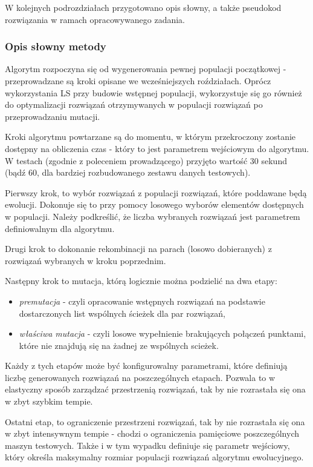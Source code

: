 \documentclass{article}
\begin{document}
W kolejnych podrozdziałach przygotowano opis słowny, a także pseudokod rozwiązania w ramach opracowywanego zadania. 

\subsubsection{Opis słowny metody}
Algorytm rozpoczyna się od wygenerowania pewnej populacji początkowej - przeprowadzane są kroki opisane we wcześniejszych roździałach. Oprócz wykorzystania LS przy budowie wstępnej populacji, wykorzystuje się go również do optymalizacji rozwiązań otrzymywanych w populacji rozwiązań po przeprowadzaniu mutacji.

Kroki algorytmu powtarzane są do momentu, w którym przekroczony zostanie dostępny na obliczenia czas - który to jest parametrem wejściowym do algorytmu. W testach (zgodnie z poleceniem prowadzącego) przyjęto wartość 30 sekund (bądź 60, dla bardziej rozbudowanego zestawu danych testowych). 

Pierwszy krok, to wybór rozwiązań z populacji rozwiązań, które poddawane będą ewolucji. Dokonuje się to przy pomocy losowego wyborów elementów dostępnych w populacji. Należy podkreślić, że liczba wybranych rozwiązań jest parametrem definiowalnym dla algorytmu.

Drugi krok to dokonanie rekombinacji na parach (losowo dobieranych) z rozwiązań wybranych w kroku poprzednim.

Następny krok to mutacja, którą logicznie można podzielić na dwa etapy:
	\begin{itemize}
		\item \emph{premutacja} - czyli opracowanie wstępnych rozwiązań na podstawie dostarczonych list wspólnych ścieżek dla par rozwiązań,
		\item \emph{właściwa mutacja} - czyli losowe wypełnienie brakujących połączeń punktami, które nie znajdują się na żadnej ze wspólnych scieżek.
	\end{itemize}
	
Każdy z tych etapów może być konfigurowalny parametrami, które definiują liczbę generowanych rozwiązań na poszczególnych etapach. Pozwala to w elastyczny sposób zarządzać przestrzenią rozwiązań, tak by nie rozrastała się ona w zbyt szybkim tempie.

Ostatni etap, to ograniczenie przestrzeni rozwiązań, tak by nie rozrastała się ona w zbyt intensywnym tempie - chodzi o ograniczenia pamięciowe poszczególnych maszyn testowych. Także i w tym wypadku definiuje się parametr wejściowy, który określa maksymalny rozmiar populacji rozwiązań algorytmu ewolucyjnego.
\end{document}
